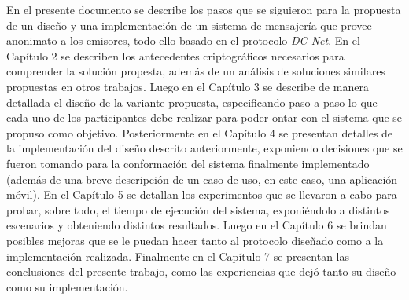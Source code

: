 En el presente documento se describe los pasos que se siguieron para la propuesta de un diseño y una implementación de un sistema de mensajería que provee anonimato a los emisores, todo ello basado en el protocolo \emph{DC-Net}. En el Capítulo 2 se describen los antecedentes criptográficos necesarios para comprender la solución propesta, además de un análisis de soluciones similares propuestas en otros trabajos. Luego en el Capítulo 3 se describe de manera detallada el diseño de la variante propuesta, especificando paso a paso lo que cada uno de los participantes debe realizar para poder ontar con el sistema que se propuso como objetivo. Posteriormente en el Capítulo 4 se presentan detalles de la implementación del diseño descrito anteriormente, exponiendo decisiones que se fueron tomando para la conformación del sistema finalmente implementado (además de una breve descripción de un caso de uso, en este caso, una aplicación móvil). En el Capítulo 5 se detallan los experimentos que se llevaron a cabo para probar, sobre todo, el tiempo de ejecución del sistema, exponiéndolo a distintos escenarios y obteniendo distintos resultados. Luego en el Capítulo 6 se brindan posibles mejoras que se le puedan hacer tanto al protocolo diseñado como a la implementación realizada. Finalmente en el Capítulo 7 se presentan las conclusiones del presente trabajo, como las experiencias que dejó tanto su diseño como su implementación.
